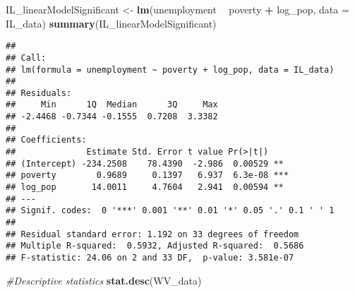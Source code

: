 \documentclass[
]{article}
\newenvironment{Shaded}{\begin{snugshade}}{\end{snugshade}}
\newcommand{\CommentTok}[1]{\textcolor[rgb]{0.56,0.35,0.01}{\textit{#1}}}
\newcommand{\DataTypeTok}[1]{\textcolor[rgb]{0.13,0.29,0.53}{#1}}
\newcommand{\KeywordTok}[1]{\textcolor[rgb]{0.13,0.29,0.53}{\textbf{#1}}}
\newcommand{\NormalTok}[1]{#1}
\newcommand{\OperatorTok}[1]{\textcolor[rgb]{0.81,0.36,0.00}{\textbf{#1}}}
\newcommand{\StringTok}[1]{\textcolor[rgb]{0.31,0.60,0.02}{#1}}
\begin{document}
\begin{Shaded}
\begin{Highlighting}[]
\NormalTok{IL_linearModelSignificant <-}\StringTok{ }\KeywordTok{lm}\NormalTok{(unemployment }\OperatorTok{~}\StringTok{ }\NormalTok{poverty }\OperatorTok{+}\StringTok{ }\NormalTok{log_pop, }\DataTypeTok{data =}\NormalTok{ IL_data)}
\KeywordTok{summary}\NormalTok{(IL_linearModelSignificant)}
\end{Highlighting}
\end{Shaded}

\begin{verbatim}
## 
## Call:
## lm(formula = unemployment ~ poverty + log_pop, data = IL_data)
## 
## Residuals:
##     Min      1Q  Median      3Q     Max 
## -2.4468 -0.7344 -0.1555  0.7208  3.3382 
## 
## Coefficients:
##              Estimate Std. Error t value Pr(>|t|)    
## (Intercept) -234.2508    78.4390  -2.986  0.00529 ** 
## poverty        0.9689     0.1397   6.937  6.3e-08 ***
## log_pop       14.0011     4.7604   2.941  0.00594 ** 
## ---
## Signif. codes:  0 '***' 0.001 '**' 0.01 '*' 0.05 '.' 0.1 ' ' 1
## 
## Residual standard error: 1.192 on 33 degrees of freedom
## Multiple R-squared:  0.5932, Adjusted R-squared:  0.5686 
## F-statistic: 24.06 on 2 and 33 DF,  p-value: 3.581e-07
\end{verbatim}

\begin{Shaded}
\end{Shaded}

\begin{Shaded}
\begin{Highlighting}[]
\CommentTok{#Descriptive statistics}
\KeywordTok{stat.desc}\NormalTok{(WV_data)}
\end{Highlighting}
\end{Shaded}
\end{document}
